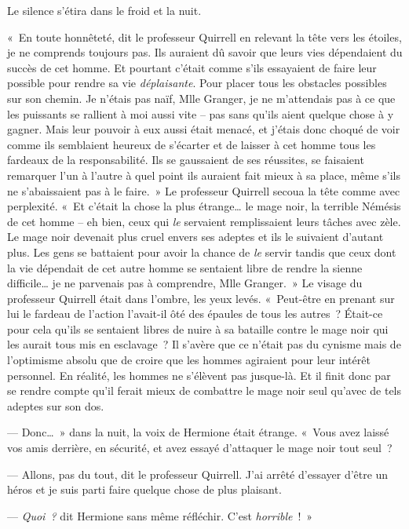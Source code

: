 Le silence s'étira dans le froid et la nuit.

«~En toute honnêteté, dit le professeur Quirrell en relevant la tête vers les étoiles, je ne comprends toujours pas.
Ils auraient dû savoir que leurs vies dépendaient du succès de cet homme.
Et pourtant c'était comme s'ils essayaient de faire leur possible pour rendre sa vie \emph{déplaisante}.
Pour placer tous les obstacles possibles sur son chemin.
Je n'étais pas naïf, Mlle Granger, je ne m'attendais pas à ce que les puissants se rallient à moi aussi vite -- pas sans qu'ils aient quelque chose à y gagner.
Mais leur pouvoir à eux aussi était menacé, et j'étais donc choqué de voir comme ils semblaient heureux de s'écarter et de laisser à cet homme tous les fardeaux de la responsabilité.
Ils se gaussaient de ses réussites, se faisaient remarquer l'un à l'autre à quel point ils auraient fait mieux à sa place, même s'ils ne s'abaissaient pas à le faire.~»
Le professeur Quirrell secoua la tête comme avec perplexité.
«~Et c'était la chose la plus étrange… le mage noir, la terrible Némésis de cet homme -- eh bien, ceux qui \emph{le} servaient remplissaient leurs tâches avec zèle.
Le mage noir devenait plus cruel envers ses adeptes et ils le suivaient d'autant plus.
Les gens se battaient pour avoir la chance de \emph{le} servir tandis que ceux dont la vie dépendait de cet autre homme se sentaient libre de rendre la sienne difficile… je ne parvenais pas à comprendre, Mlle Granger.~»
Le visage du professeur Quirrell était dans l'ombre, les yeux levés.
«~Peut-être en prenant sur lui le fardeau de l'action l'avait-il ôté des épaules de tous les autres~?
Était-ce pour cela qu'ils se sentaient libres de nuire à sa bataille contre le mage noir qui les aurait tous mis en esclavage~?
Il s'avère que ce n'était pas du cynisme mais de l'optimisme absolu que de croire que les hommes agiraient pour leur intérêt personnel.
En réalité, les hommes ne s'élèvent pas jusque-là.
Et il finit donc par se rendre compte qu'il ferait mieux de combattre le mage noir seul qu'avec de tels adeptes sur son dos.

--- Donc…~»
dans la nuit, la voix de Hermione était étrange.
«~Vous avez laissé vos amis derrière, en sécurité, et avez essayé d'attaquer le mage noir tout seul~?

--- Allons, pas du tout, dit le professeur Quirrell.
J'ai arrêté d'essayer d'être un héros et je suis parti faire quelque chose de plus plaisant.

--- \emph{Quoi~?} dit Hermione sans même réfléchir.
C'est \emph{horrible}~!~»

